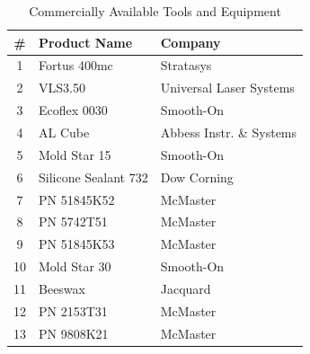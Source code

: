 \begin{table}[htb]
\caption{Commercially Available Tools and Equipment}
\centering
\begin{tabular}{c l l}
\hline
\hline
\# & Product Name & Company\\
\hline
1 & Fortus 400mc & Stratasys\\
2 & VLS3.50 & Universal Laser Systems\\
3 & Ecoflex 0030 & Smooth-On\\
4 & AL Cube & Abbess Instr. \& Systems\\
5 & Mold Star 15 & Smooth-On\\
6 & Silicone Sealant 732 & Dow Corning\\
7 & PN 51845K52 & McMaster\\
8 & PN 5742T51 & McMaster\\
9 & PN 51845K53 & McMaster\\
10 & Mold Star 30 & Smooth-On\\
11 & Beeswax & Jacquard\\
12 & PN 2153T31& McMaster\\
13 & PN 9808K21& McMaster\\
\hline
\end{tabular}
\label{tab:MachineTools}
\end{table} 